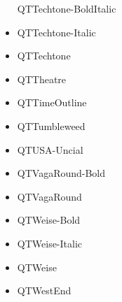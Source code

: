 \documentclass[12pt]{article}
\begin{document}
\begin{itemize}
QTTechtone-BoldItalic\item QTTechtone-Italic\item QTTechtone\item QTTheatre\item QTTimeOutline\item QTTumbleweed\item QTUSA-Uncial\item QTVagaRound-Bold\item QTVagaRound\item QTWeise-Bold\item QTWeise-Italic\item QTWeise\item QTWestEnd
\end{itemize}
\end{document}
